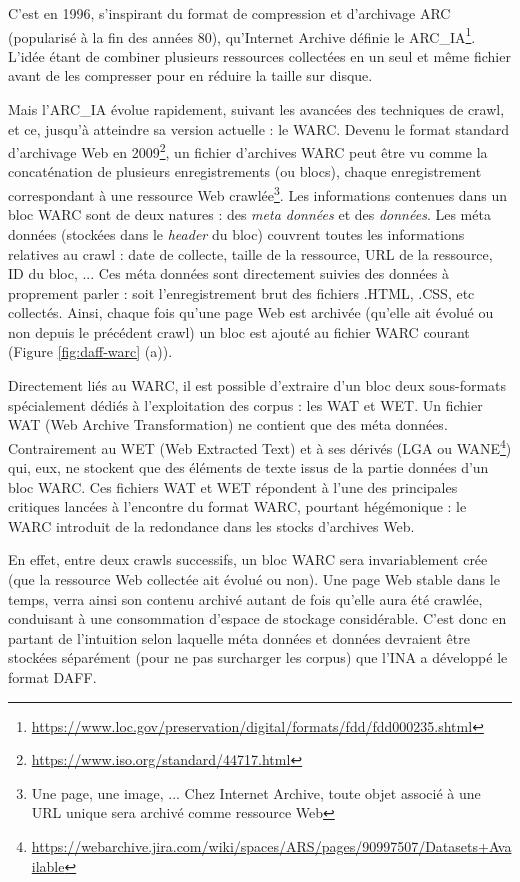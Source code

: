 \documentclass[symmetric,justified,marginals=raggedouter]{tufte-book}
\begin{document}
C'est en 1996, s'inspirant du format de compression et d'archivage ARC (popularisé à la fin des années 80), qu'Internet Archive définie le ARC\_IA\footnote{\url{https://www.loc.gov/preservation/digital/formats/fdd/fdd000235.shtml}}. L'idée étant de combiner plusieurs ressources collectées en un seul et même fichier avant de les compresser pour en réduire la taille sur disque.

Mais l'ARC\_IA évolue rapidement, suivant les avancées des techniques de crawl, et ce, jusqu'à atteindre sa version actuelle : le WARC. Devenu le format standard d'archivage Web en 2009\footnote{\url{https://www.iso.org/standard/44717.html}}, un fichier d'ar\-chives WARC peut être vu comme la concaténation de plusieurs enregistrements (ou blocs), chaque enregistrement correspondant à une ressource Web crawlée\footnote{Une page, une image, ... Chez Internet Archive, toute objet associé à une URL unique sera archivé comme ressource Web}. Les informations contenues dans un bloc WARC sont de deux natures : des \textit{meta données} et des \textit{données}. Les méta données (stockées dans le \textit{header} du bloc) couvrent toutes les informations relatives au crawl : date de collecte, taille de la ressource, URL de la ressource, ID du bloc, ... Ces méta données sont directement suivies des données à proprement parler : soit l'enregistrement brut des fichiers .HTML, .CSS, etc collectés. Ainsi, chaque fois qu'une page Web est archivée (qu'elle ait évolué ou non depuis le précédent crawl) un bloc est ajouté au fichier WARC courant (Figure \ref{fig:daff-warc} (a)). 

Directement liés au WARC, il est possible d'extraire d'un bloc deux sous-formats spécialement dédiés à l'exploitation des corpus : les WAT et WET. Un fichier WAT (Web Archive Transformation) ne contient que des méta données. Contrairement au WET (Web Extracted Text) et à ses dérivés (LGA ou WANE\footnote{\url{https://webarchive.jira.com/wiki/spaces/ARS/pages/90997507/Datasets+Available}}) qui, eux, ne stockent que des éléments de texte issus de la partie données d'un bloc WARC. Ces fichiers WAT et WET répondent à l'une des principales critiques lancées à l'encontre du format WARC, pourtant hégémonique : le WARC introduit de la redondance dans les stocks d'archives Web.

En effet, entre deux crawls successifs, un bloc WARC sera invariablement crée (que la ressource Web collectée ait évolué ou non). Une page Web stable dans le temps, verra ainsi son contenu archivé autant de fois qu'elle aura été crawlée, conduisant à une consommation d'espace de stockage considérable. C'est donc en partant de l'intuition selon laquelle méta données et données devraient être stockées séparément (pour ne pas surcharger les corpus) que l'INA a développé le format DAFF.  
\end{document}
